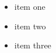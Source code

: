 \documentclass{article}
\begin{document}
  
  \begin{itemize}
  	\renewcommand{\labelitemi}{\PencilRight}
	\itemsep=0pt
	\parskip=0pt
	\item item one
	\item item two
	\item item three
  \end{itemize}
  
\end{document}
